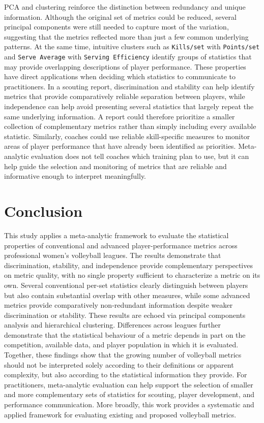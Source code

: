 \documentclass[10pt]{article}
\begin{document}
PCA and clustering reinforce the distinction between redundancy and unique information.
Although the original set of metrics could be reduced, several principal components were still needed to capture most of the variation, suggesting that the metrics reflected more than just a few common underlying patterns.
At the same time, intuitive clusters such as \texttt{Kills/set} with \texttt{Points/set} and \texttt{Serve Average} with \texttt{Serving Efficiency} identify groups of statistics that may provide overlapping descriptions of player performance.
These properties have direct applications when deciding which statistics to communicate to practitioners.
In a scouting report, discrimination and stability can help identify metrics that provide comparatively reliable separation between players, while independence can help avoid presenting several statistics that largely repeat the same underlying information.
A report could therefore prioritize a smaller collection of complementary metrics rather than simply including every available statistic.
Similarly, coaches could use reliable skill-specific measures to monitor areas of player performance that have already been identified as priorities.
Meta-analytic evaluation does not tell coaches which training plan to use, but it can help guide the selection and monitoring of metrics that are reliable and informative enough to interpret meaningfully.


\section{Conclusion}

This study applies a meta-analytic framework to evaluate the statistical properties of conventional and advanced player-performance metrics across professional women's volleyball leagues.
The results demonstrate that discrimination, stability, and independence provide complementary perspectives on metric quality, with no single property sufficient to characterize a metric on its own.
Several conventional per-set statistics clearly distinguish between players but also contain substantial overlap with other measures, while some advanced metrics provide comparatively non-redundant information despite weaker discrimination or stability.
These results are echoed via principal components analysis and hierarchical clustering.
Differences across leagues further demonstrate that the statistical behaviour of a metric depends in part on the competition, available data, and player population in which it is evaluated.
Together, these findings show that the growing number of volleyball metrics should not be interpreted solely according to their definitions or apparent complexity, but also according to the statistical information they provide.
For practitioners, meta-analytic evaluation can help support the selection of smaller and more complementary sets of statistics for scouting, player development, and performance communication.
More broadly, this work provides a systematic and applied framework for evaluating existing and proposed volleyball metrics.
\end{document}
